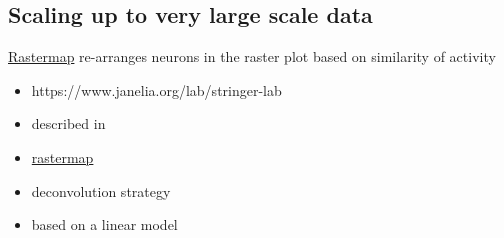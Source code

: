 \documentclass[brainsci, %
               review,submit,pdftex,moreauthors%
               ]{Definitions/mdpi}
\begin{document}

\subsection{Scaling up to very large scale data}


\href{https://nbviewer.org/github/MouseLand/rastermap/blob/master/tutorial/tutorial.ipynb}{Rastermap} re-arranges neurons in the raster plot based on similarity of activity

\begin{itemize}
 \item
  https://www.janelia.org/lab/stringer-lab
\item
  described in~\citep{pachitariu_robustness_2018}
\item
  \href{https://github.com/MouseLand/rastermap}{rastermap}
\item
  deconvolution strategy
\item
  based on a linear model
\end{itemize}
\end{document}
